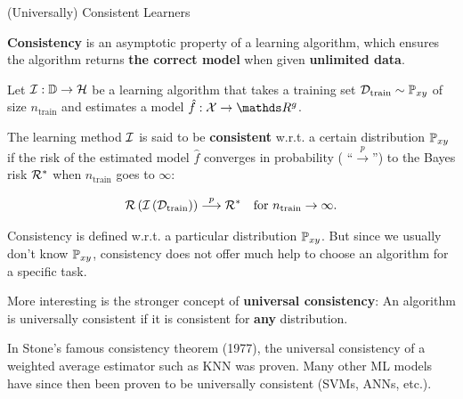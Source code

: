 \documentclass[11pt,compress,t,notes=noshow, xcolor=table]{beamer}
\begin{document}
\begin{vbframe}{(Universally) Consistent Learners }

\textbf{Consistency} is an asymptotic property of a learning algorithm, which ensures the algorithm returns \textbf{the correct model} when given \textbf{unlimited data}.

\lz 

Let $\mathcal{I}:\mathbb{D} \to \mathcal{H}$ be a learning algorithm that takes a training set $\mathcal{D}_{\text{train}} \sim \mathbb{P}_{xy}$ of size $n_\text{train}$ and estimates a model $\hat f: \Xspace \to \R^g$. 

\lz 

The learning method $\mathcal{I}$ is said to be \textbf{consistent} w.r.t. a certain distribution $\mathbb{P}_{xy}$ if the risk of the estimated model $\hat f$ converges in probability ( \enquote{$\overset{p}{\longrightarrow}$}) to the Bayes risk $\mathcal{R}^\ast$ when $n_\text{train}$ goes to $\infty$: 

$$
	\mathcal{R}\left(\mathcal{I}\left(\mathcal{D}_{\text{train}}\right)\right) \overset{p}{\longrightarrow} \mathcal{R}^\ast \quad \text{for } n_\text{train} \to \infty.
$$

\vfill




\framebreak 

Consistency is defined w.r.t. a particular distribution $\mathbb{P}_{xy}$.
But since we usually don't know $\mathbb{P}_{xy}$, consistency
does not offer much help to choose an algorithm for a specific task. 

\lz 

More interesting is the stronger concept of \textbf{universal consistency}: An algorithm is universally consistent if it is consistent for \textbf{any} distribution. 

\lz 

In Stone's famous consistency theorem (1977), the universal consistency of a weighted average estimator such as KNN was proven. Many other ML models have since then been proven to be universally consistent (SVMs, ANNs, etc.).



\end{vbframe}



\end{document}
